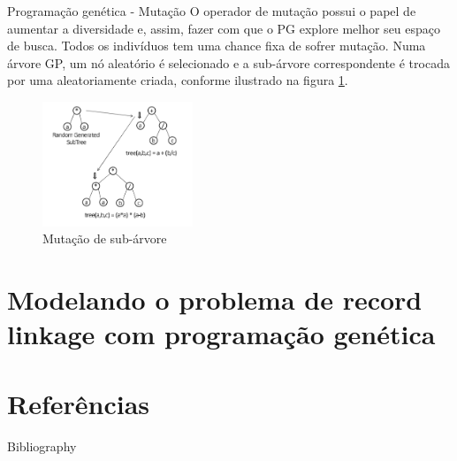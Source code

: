 \documentclass{beamer}
\begin{document}
  \begin{frame}{Programação genética - Mutação}
      O operador de mutação possui o papel de aumentar a diversidade e, assim, fazer com que o PG explore melhor seu espaço de busca. Todos os indivíduos tem uma chance fixa de sofrer mutação. Numa árvore GP, um nó aleatório é selecionado e a sub-árvore correspondente é trocada por uma aleatoriamente criada, conforme ilustrado na figura \ref{fig:mutacao}.
      \begin{figure}
          \centering
          \includegraphics[width=0.4\textwidth]{mutacao.png}
          \caption{Mutação de sub-árvore \cite{geneticrl}}
          \label{fig:mutacao}
      \end{figure}
  \end{frame}

  \section{Modelando o problema de record linkage com programação genética}


  \section{Referências}
      \begin{frame}{Bibliography}
          
          
      \end{frame}
\end{document}
